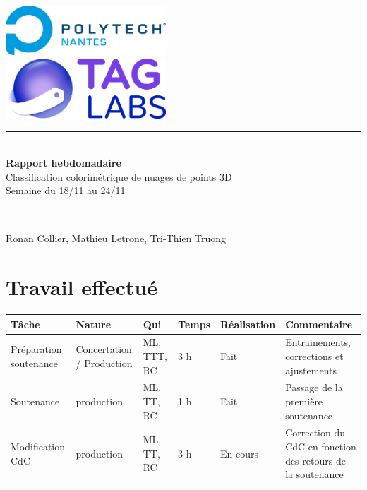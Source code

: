\documentclass[12pt,titlepage,french]{article}
\begin{document}

\begin{titlepage}
\newcommand{\HRule}{\rule{\linewidth}{0.5mm}}
\center

  \includegraphics[width=0.45\textwidth]{../ressources/img_logos/logo_polytech.png}\\[1cm]
   
  \includegraphics[width=0.45\textwidth]{../ressources/img_logos/logo_taglabs.png}


\HRule \\[0.4cm]
{ \huge \bfseries Rapport hebdomadaire\\[0.15cm] }
Classification colorimétrique de nuages de points 3D\\
Semaine du 18/11 au 24/11
\HRule \\[1.5cm]
Ronan Collier,
Mathieu Letrone,
Tri-Thien Truong
\\[1cm]
\end{titlepage}

\section{Travail effectué}

\noindent\begin{tabularx}{17cm}{|p{2.5cm}|p{2.5cm}|p{1cm}|p{1.5cm}|p{2.5cm}|X|}
    \hline
    \textbf{Tâche} & \textbf{Nature} & \textbf{Qui} & \textbf{Temps} & \textbf{Réalisation} & \textbf{Commentaire} \\
    \hline
    Préparation soutenance & Concertation / Production & ML, TTT, RC & 3 h & Fait & Entrainements, corrections et ajustements\\
    \hline
    Soutenance & production & ML, TT, RC & 1 h & Fait & Passage de la première soutenance\\
    \hline
    Modification CdC & production & ML, TT, RC & 3 h & En cours & Correction du CdC en fonction des retours de la soutenance\\
    \hline
\end{tabularx}
\end{document}
